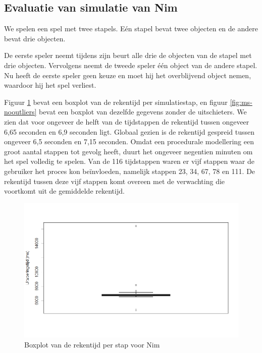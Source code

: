 \subsection{Evaluatie van simulatie van Nim}

We spelen een spel met twee stapels. E\'en stapel bevat twee objecten en de andere bevat drie objecten.

De eerste speler neemt tijdens zijn beurt alle drie de objecten van de stapel met drie objecten. Vervolgens neemt de tweede speler \'e\'en object van de andere stapel. Nu heeft de eerste speler geen keuze en moet hij het overblijvend object nemen, waardoor hij het spel verliest.

Figuur \ref{fig:ms} bevat een boxplot van de rekentijd per simulatiestap, en figuur \ref{fig:ms-nooutliers} bevat een boxplot van dezelfde gegevens zonder de uitschieters. We zien dat voor ongeveer de helft van de tijdstappen de rekentijd tussen ongeveer 6,65 seconden en 6,9 seconden ligt. Globaal gezien is de rekentijd gespreid tussen ongeveer 6,5 seconden en 7,15 seconden. Omdat een procedurale modellering een groot aantal stappen tot gevolg heeft, duurt het ongeveer negentien minuten om het spel volledig te spelen. Van de 116 tijdstappen waren er vijf stappen waar de gebruiker het proces kon be\"invloeden, namelijk stappen 23, 34, 67, 78 en 111. De rekentijd tussen deze vijf stappen komt overeen met de verwachting die voortkomt uit de gemiddelde rekentijd.

\begin{figure}
	\includegraphics[width=1.05\textwidth]{chap-evaluatie/boxplot.png}
	\caption{Boxplot van de rekentijd per stap voor Nim}
	\label{fig:ms}
\end{figure}

